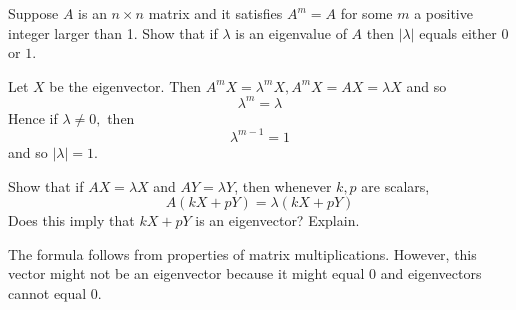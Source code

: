 \documentclass{ximera}
\begin{document}
\begin{problem}\label{prb:8.4} Suppose $A$ is an $n\times n$ matrix and it satisfies $A^{m}=A$ for
some $m$ a positive integer larger than 1. Show that if $\lambda $ is an
eigenvalue of $A$ then $\left\vert \lambda \right\vert $ equals either 0 or $
1$. \vspace{1mm}
\begin{hint}
Let $X$ be the eigenvector. Then $A^{m}X=\lambda ^{m}
X,A^{m}X=AX=\lambda X$ and so
\[
\lambda ^{m}=\lambda
\]
Hence if $\lambda \neq 0,$ then
\[
\lambda ^{m-1}=1
\]
and so $\left\vert \lambda \right\vert =1.$
\end{hint}
\end{problem}

\begin{problem}\label{prb:8.5} Show that if $AX=\lambda X$ and $AY=\lambda Y$, then whenever $k,p$ are scalars,
\begin{equation*}
A\left( kX+pY\right) =\lambda \left( kX+pY\right)
\end{equation*}
Does this imply that $kX+pY$ is an eigenvector? Explain.
\vspace{1mm}
\begin{hint}
The formula follows from properties of matrix multiplications. However,
this vector might not be an eigenvector because it might equal $0$
and eigenvectors cannot equal $0$.
\end{hint}
\end{problem}
\end{document}
